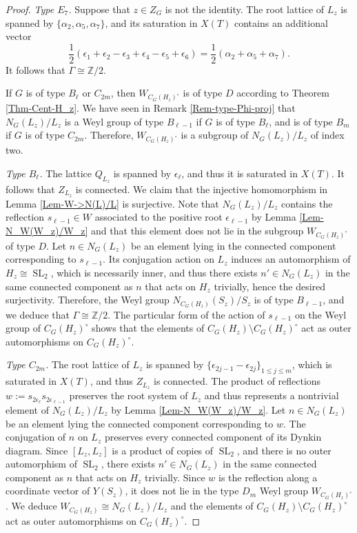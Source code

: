 \documentclass[11pt,oneside,dvipsnames]{amsart}
\theoremstyle{plain}
\theoremstyle{definition}
\theoremstyle{named}
\DeclareMathOperator{\SL}{SL}
\begin{document}
\begin{proof}
\textit{Type $E_7$.} Suppose that $z\in Z_G$ is not the identity. The root lattice of $L_z$ is spanned by $\{\alpha_2,\alpha_5,\alpha_7\}$, and its saturation in $X(T)$ contains an additional vector
$$
\frac{1}{2}(\epsilon_1+\epsilon_2-\epsilon_3+\epsilon_4-\epsilon_5+\epsilon_6)=\frac{1}{2}(\alpha_2+\alpha_5+\alpha_7).
$$
It follows that $\Gamma\cong\mathbb{Z}/2$.

If $G$ is of type $B_{\ell}$ or $C_{2m}$, then $W_{C_G(H_z)^{\circ}}$ is of type $D$ according to Theorem \ref{Thm-Cent-H_z}. We have seen in Remark \ref{Rem-type-Phi-proj} that $N_G(L_z)/L_z$ is a Weyl group of type $B_{\ell-1}$ if $G$ is of type $B_{\ell}$, and is of type $B_m$ if $G$ is of type $C_{2m}$. Therefore, $W_{C_G(H_z)^{\circ}}$ is a subgroup of $N_G(L_z)/L_z$ of index two.

\textit{Type $B_{\ell}$.} The lattice $Q_{L_z}$ is spanned by $\epsilon_{\ell}$, and thus it is saturated in $X(T)$. It follows that $Z_{L_z}$ is connected. We claim that the injective homomorphism in Lemma \ref{Lem-W->N(L)/L} is surjective. Note that $N_G(L_z)/L_z$ contains the reflection $s_{\ell-1}\in W$ associated to the positive root $\epsilon_{\ell-1}$ by Lemma \ref{Lem-N_W(W_z)/W_z} and that this element does not lie in the subgroup $W_{C_G(H_z)^{\circ}}$ of type $D$. Let $n\in N_G(L_z)$ be an element lying in the connected component corresponding to $s_{\ell-1}$. Its conjugation action on $L_z$ induces an automorphism of $H_z\cong\SL_2$, which is necessarily inner, and thus there exists $n'\in N_G(L_z)$ in the same connected component as $n$ that acts on $H_z$ trivially, hence the desired surjectivity. Therefore, the Weyl group $N_{C_G(H_z)}(S_z)/S_z$ is of type $B_{\ell-1}$, and we deduce that $\Gamma\cong\mathbb{Z}/2$. The particular form of the action of $s_{\ell-1}$ on the Weyl group of $C_G(H_z)^{\circ}$ shows that the elements of $C_G(H_z)\setminus C_G(H_z)^{\circ}$ act as outer automorphisms on $C_G(H_z)^{\circ}$.

\textit{Type $C_{2m}$.} The root lattice of $L_z$ is spanned by $\{\epsilon_{2j-1}-\epsilon_{2j}\}_{1\le j\le m}$, which is saturated in $X(T)$, and thus $Z_{L_z}$ is connected. The product of reflections $w:=s_{2\epsilon_{\ell}}s_{2\epsilon_{\ell-1}}$ preserves the root system of $L_z$ and thus represents a nontrivial element of $N_G(L_z)/L_z$ by Lemma \ref{Lem-N_W(W_z)/W_z}. Let $n\in N_G(L_z)$ be an element lying the connected component corresponding to $w$. The conjugation of $n$ on $L_z$ preserves every connected component of its Dynkin diagram. Since $[L_z,L_z]$ is a product of copies of $\SL_2$, and there is no outer automorphism of $\SL_2$, there exists $n'\in N_G(L_z)$ in the same connected component as $n$ that acts on $H_z$ trivially. Since $w$ is the reflection along a coordinate vector of $Y(S_z)$, it does not lie in the type $D_m$ Weyl group $W_{C_G(H_z)^{\circ}}$. We deduce $W_{C_G(H_z)}\cong N_G(L_z)/L_z$ and the elements of $C_G(H_z)\setminus C_G(H_z)^{\circ}$ act as outer automorphisms on $C_G(H_z)^{\circ}$.


\end{proof}
\end{document}
